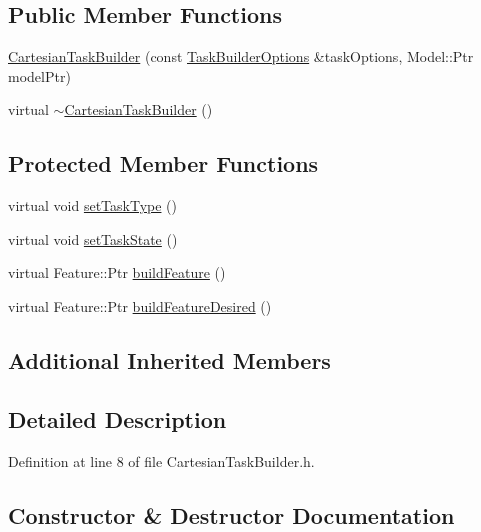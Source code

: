 \subsection*{Public Member Functions}
\begin{DoxyCompactItemize}
\item 
\hyperlink{classocra_1_1CartesianTaskBuilder_ad78453b86c3777783c94098967426bad}{Cartesian\+Task\+Builder} (const \hyperlink{classocra_1_1TaskBuilderOptions}{Task\+Builder\+Options} \&task\+Options, Model\+::\+Ptr model\+Ptr)
\item 
virtual \hyperlink{classocra_1_1CartesianTaskBuilder_aecc30a79dfbeaf935d302a3f1e2c3fac}{$\sim$\+Cartesian\+Task\+Builder} ()
\end{DoxyCompactItemize}
\subsection*{Protected Member Functions}
\begin{DoxyCompactItemize}
\item 
virtual void \hyperlink{classocra_1_1CartesianTaskBuilder_a679842b95d6f7296a466636fd21bbbb8}{set\+Task\+Type} ()
\item 
virtual void \hyperlink{classocra_1_1CartesianTaskBuilder_a9e3175e5792c5ed9a7e3febbe458d21c}{set\+Task\+State} ()
\item 
virtual Feature\+::\+Ptr \hyperlink{classocra_1_1CartesianTaskBuilder_a58c8e4a299db03180c058eefcd711052}{build\+Feature} ()
\item 
virtual Feature\+::\+Ptr \hyperlink{classocra_1_1CartesianTaskBuilder_a308b204435c4063991d8101c0a8c512c}{build\+Feature\+Desired} ()
\end{DoxyCompactItemize}
\subsection*{Additional Inherited Members}


\subsection{Detailed Description}


Definition at line 8 of file Cartesian\+Task\+Builder.\+h.



\subsection{Constructor \& Destructor Documentation}
\hypertarget{classocra_1_1CartesianTaskBuilder_ad78453b86c3777783c94098967426bad}{}\label{classocra_1_1CartesianTaskBuilder_ad78453b86c3777783c94098967426bad} 
